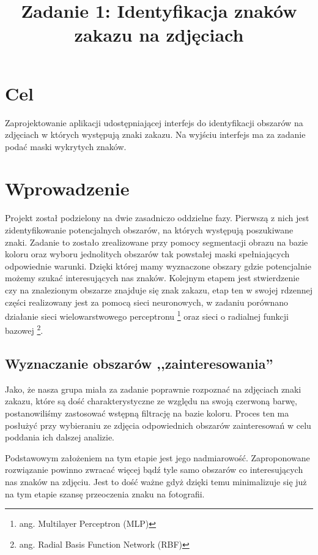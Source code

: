 \documentclass{classrep}
\author{
  \studentinfo{Paweł Musiał}{178726} \and
  \studentinfo{Łukasz Michalski}{178724}
}
\title{Zadanie 1: Identyfikacja znaków zakazu na zdjęciach}
\begin{document}
\maketitle



\section{Cel}
Zaprojektowanie aplikacji udostępniającej interfejs do identyfikacji obszarów na zdjęciach w których występują znaki zakazu. Na wyjściu interfejs ma za zadanie podać maski wykrytych znaków.

\section{Wprowadzenie}
Projekt został podzielony na dwie zasadniczo oddzielne fazy. Pierwszą z nich jest zidentyfikowanie potencjalnych obszarów, na których występują poszukiwane znaki. Zadanie to zostało zrealizowane przy pomocy segmentacji obrazu na bazie koloru oraz wyboru jednolitych obszarów tak powstałej maski spełniających odpowiednie warunki. Dzięki której mamy wyznaczone obszary gdzie potencjalnie możemy szukać interesujących nas znaków. Kolejnym etapem jest stwierdzenie czy na znalezionym obszarze znajduje się znak zakazu, etap ten w swojej rdzennej części realizowany jest za pomocą sieci neuronowych, w zadaniu porównano działanie sieci wielowarstwowego perceptronu \footnote{ang. Multilayer Perceptron (MLP)} oraz sieci o radialnej funkcji bazowej \footnote{ang. Radial Basis Function Network (RBF)}.

\subsection{Wyznaczanie obszarów ,,zainteresowania''}
Jako, że nasza grupa miała za zadanie poprawnie rozpoznać na zdjęciach znaki zakazu, które są dość charakterystyczne ze względu na swoją czerwoną barwę, postanowiliśmy zastosować wstępną filtrację na bazie koloru. Proces ten ma posłużyć przy wybieraniu ze zdjęcia odpowiednich obszarów zainteresowań w celu poddania ich dalszej analizie. 

Podstawowym założeniem na tym etapie jest jego nadmiarowość. Zaproponowane rozwiązanie powinno zwracać więcej bądź tyle samo obszarów co interesujących nas znaków na zdjęciu. Jest to dość ważne gdyż dzięki temu minimalizuje się już na tym etapie szansę przeoczenia znaku na fotografii. 
\end{document}

